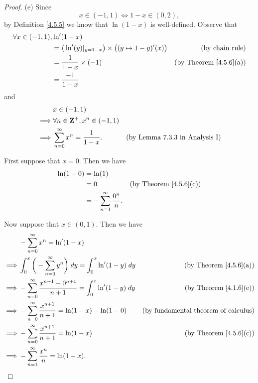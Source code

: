 \begin{proof}{(e)}
    Since
    \[
        x \in (-1, 1) \iff 1 - x \in (0, 2),
    \]
    by Definition \ref{4.5.5} we know that \(\ln(1 - x)\) is well-defined.
    Observe that
    \begin{align*}
        \forall x \in (-1, 1), & \ln'(1 - x)                                                                                                  \\
                               & = \big(\ln'(y)|_{y = 1 - x}\big) \times \big((y \mapsto 1 - y)'(x)\big) & \text{(by chain rule)}             \\
                               & = \frac{1}{1 - x} \times (-1)                                           & \text{(by Theorem \ref{4.5.6}(a))} \\
                               & = \frac{-1}{1 - x}
    \end{align*}
    and
    \begin{align*}
                 & x \in (-1, 1)                                                                      \\
        \implies & \forall n \in \mathbf{Z}^+, x^n \in (-1, 1)                                                \\
        \implies & \sum_{n = 0}^\infty x^n = \frac{1}{1 - x}. & \text{(by Lemma 7.3.3 in Analysis I)}
    \end{align*}

    First suppose that \(x = 0\).
    Then we have
    \begin{align*}
        \ln(1 - 0) & = \ln(1)                                                                    \\
                   & = 0                                    & \text{(by Theorem \ref{4.5.6}(c))} \\
                   & = - \sum_{n = 1}^\infty \frac{0^n}{n}.
    \end{align*}

    Now suppose that \(x \in (0, 1)\).
    Then we have
    \begin{align*}
                 & - \sum_{n = 0}^\infty x^n = \ln'(1 - x)                                                                                              \\
        \implies & \int_0^x \bigg(- \sum_{n = 0}^\infty y^n\bigg) \; dy = \int_0^x \ln'(1 - y) \; dy      & \text{(by Theorem \ref{4.5.6}(a))}          \\
        \implies & - \sum_{n = 0}^\infty \frac{x^{n + 1} - 0^{n + 1}}{n + 1} = \int_0^x \ln'(1 - y) \; dy & \text{(by Theorem \ref{4.1.6}(e))}          \\
        \implies & - \sum_{n = 0}^\infty \frac{x^{n + 1}}{n + 1} = \ln(1 - x) - \ln(1 - 0)                & \text{(by fundamental theorem of calculus)} \\
        \implies & - \sum_{n = 0}^\infty \frac{x^{n + 1}}{n + 1} = \ln(1 - x)                             & \text{(by Theorem \ref{4.5.6}(c))}          \\
        \implies & - \sum_{n = 1}^\infty \frac{x^n}{n} = \ln(1 - x).
    \end{align*}


\end{proof}
